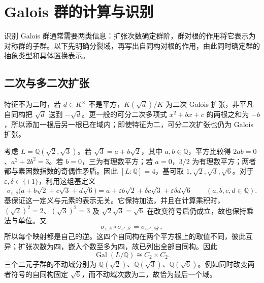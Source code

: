 
\section{Galois 群的计算与识别}
\label{b1:sec:1903}

%
%

识别 Galois 群通常需要两类信息：扩张次数确定群阶，群对根的作用将它表示为对称群的子群。以下先明确分裂域，再写出自同构对根的作用，由此同时确定群的抽象类型和具体置换表示。

\subsection{二次与多二次扩张}
\label{b1:subsec:1903:01}

特征不为二时，若 \(d\in K^\times\) 不是平方，\(K(\sqrt d)/K\) 为二次 Galois 扩张，非平凡自同构把 \(\sqrt d\) 送到 \(-\sqrt d\)。更一般的可分二次多项式 \(x^2+bx+c\) 的两根之和为 \(-b\)，所以添加一根后另一根已在域内；即使特征为二，可分二次扩张也仍为 Galois 扩张。

\ProseParagraphBreak
考虑 \(L=\mathbb Q(\sqrt2,\sqrt3)\)。若 \(\sqrt3=a+b\sqrt2\)，其中 \(a,b\in\mathbb Q\)，平方比较得 \(2ab=0\)、\(a^2+2b^2=3\)。若 \(b=0\)，三为有理数平方；若 \(a=0\)，\(3/2\) 为有理数平方；两者都与素因数指数的奇偶性矛盾。因此 \([L:\mathbb Q]=4\)，基可取 \(1,\sqrt2,\sqrt3,\sqrt6\)。对于 \(\varepsilon,\delta\in\{\pm1\}\)，利用这组基定义
\[
	\sigma_{\varepsilon,\delta} \bigl(a+b\sqrt2+c\sqrt3+d\sqrt6\bigr) =a+\varepsilon b\sqrt2+\delta c\sqrt3+\varepsilon\delta d\sqrt6 \qquad(a,b,c,d\in\mathbb Q).
\]
基保证这一定义与元素的表示无关。它保持加法，并且在计算乘积时，\((\sqrt2)^2=2\)、\((\sqrt3)^2=3\) 及 \(\sqrt2\sqrt3=\sqrt6\) 在改变符号后仍成立，故也保持乘法与单位。又
\[
	\sigma_{\varepsilon,\delta}\circ\sigma_{\varepsilon',\delta'} =\sigma_{\varepsilon\varepsilon',\delta\delta'},
\]
所以每个映射都是自己的逆。这四个自同构在两个平方根上的取值不同，彼此互异；扩张次数为四，嵌入个数至多为四，故已列出全部自同构。因此
\[
	\operatorname{Gal}(L/\mathbb Q)\cong C_2\times C_2.
\]
三个二元子群的不动域分别为 \(\mathbb Q(\sqrt2)\)、\(\mathbb Q(\sqrt3)\)、\(\mathbb Q(\sqrt6)\)。例如同时改变两者符号的自同构固定 \(\sqrt6\)，而不动域次数为二，故恰为最后一个域。

